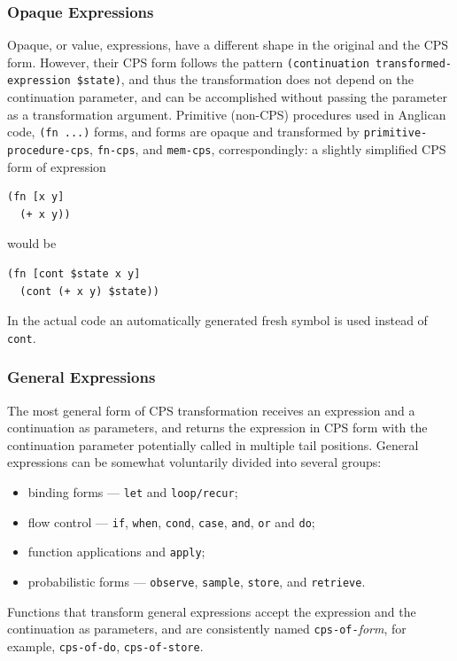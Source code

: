 \documentclass[preprint]{sigplanconf}
\begin{document}
{\subsubsection{Opaque Expressions}
\label{sec:opaque}

Opaque, or value, expressions, have a different shape in the
original and the CPS form. However, their CPS form follows the
pattern \texttt{(continuation transformed-expression \$state)}, and thus
the transformation does not depend on the continuation parameter, and
can be accomplished without passing the parameter as a
transformation argument. Primitive (non-CPS) procedures used in
Anglican code, \texttt{(fn ...)} forms, and 
forms are opaque and transformed by
\texttt{primitive-}\linebreak[0]\texttt{procedure-}\linebreak[0]\texttt{cps},
\texttt{fn-cps}, and \texttt{mem-cps}, correspondingly: a
slightly simplified CPS form of expression
\begin{lstlisting}[style=default]
(fn [x y]
  (+ x y))
\end{lstlisting}
would be
\begin{lstlisting}[style=default]
(fn [cont $state x y]
  (cont (+ x y) $state))
\end{lstlisting}
In the actual code an automatically generated fresh symbol is
used instead of \texttt{cont}.

\subsubsection{General Expressions}
\label{seq:general}

The most general form of CPS transformation receives an
expression and a continuation as parameters, and returns the expression
in CPS form with the continuation parameter potentially called in multiple
tail positions. General expressions can be somewhat voluntarily
divided into several groups:
\begin{itemize}
    \item binding forms --- \texttt{let} and
        \texttt{loop/recur};
    \item flow control --- \texttt{if}, \texttt{when},
        \texttt{cond}, \texttt{case}, \texttt{and}, \texttt{or} and \texttt{do};
    \item function applications and \texttt{apply};
    \item probabilistic forms --- \texttt{observe},
        \texttt{sample}, \texttt{store}, and \texttt{retrieve}.
\end{itemize}
Functions that transform general expressions accept the
expression and the continuation as parameters, and are
consistently named \texttt{cps-of-}\textit{form}, for example,
\texttt{cps-of-do}, \texttt{cps-of-store}.

}{%
}
\end{document}
